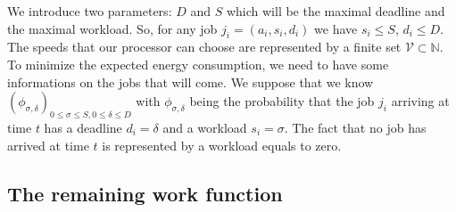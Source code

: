 \documentclass[
10pt, %
a4paper, %
oneside, %
headinclude,footinclude, %
BCOR5mm, %
]{scrartcl}
\newcommand{\N}{\mathbb{N}}
\newcommand{\V}{\mathcal{V}}
\begin{document}
We introduce two parameters: $D$ and $S$ which will be the maximal
deadline and the maximal workload. So, for any job
$j_i=(a_i,s_i,d_i)$ we have $s_i\leq S$, $d_i\leq D$.
The speeds that our processor can choose are represented by a finite
set $\V\subset\N$. To minimize the expected energy consumption, we
need to have some informations on the jobs that will come. We suppose
that we know $(\phi_{\sigma,\delta})_{0\leq\sigma\leq S,0\leq\delta\leq D}$ with
$\phi_{\sigma,\delta}$ being the probability that the job $j_i$
arriving at time $t$ has a deadline $d_i=\delta$ and a workload
$s_i=\sigma$. The fact that no job has arrived at time $t$ is
represented by a workload equals to zero.

\subsection{The remaining work function}
\end{document}
